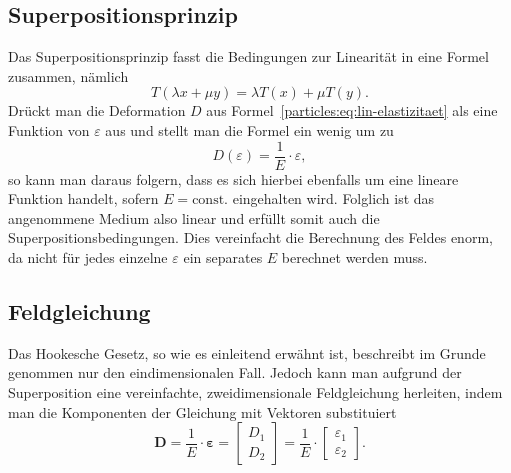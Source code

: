 \subsection{Superpositionsprinzip}
Das Superpositionsprinzip fasst die Bedingungen zur Linearität in eine Formel zusammen, nämlich
\[
    T(\lambda x + \mu y)
    = \lambda T(x) + \mu T(y).
\]
Drückt man die Deformation $D$ aus Formel~\ref{particles:eq:lin-elastizitaet} als eine Funktion von $\varepsilon$ aus
und stellt man die Formel ein wenig um zu 
\[
    D(\varepsilon)
    = \frac{1}{E} \cdot \varepsilon,
\]
so kann man daraus folgern, dass es sich hierbei ebenfalls um eine lineare Funktion handelt, 
sofern $E = \text{const.}$ eingehalten wird. %
Folglich ist das angenommene Medium also linear und erfüllt somit auch die Superpositionsbedingungen.
Dies vereinfacht die Berechnung des Feldes enorm, 
da nicht für jedes einzelne $\varepsilon$ ein separates $E$ berechnet werden muss. 


\subsection{Feldgleichung}
Das Hookesche Gesetz, so wie es einleitend erwähnt ist, 
beschreibt im Grunde genommen nur den eindimensionalen Fall. 
Jedoch kann man aufgrund der Superposition eine vereinfachte,
zweidimensionale Feldgleichung herleiten, 
indem man die Komponenten der Gleichung mit Vektoren substituiert %
\[
    \mathbf{D} 
    =   \frac{1}{E}
        \cdot \bm{\varepsilon}
    =   \begin{bmatrix}
            D_1\\
            D_2
        \end{bmatrix}
    =   \frac{1}{E}
        \cdot 
        \begin{bmatrix}
            \varepsilon_1\\
            \varepsilon_2
        \end{bmatrix}.
\]




